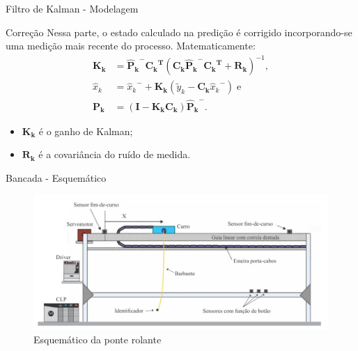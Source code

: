 \documentclass[10pt]{beamer}
\begin{document}
\begin{frame}[fragile]{Filtro de Kalman - Modelagem}
\begin{block}{Correção}
Nessa parte, o estado calculado na predição é corrigido incorporando-se uma medição mais recente do processo. Matematicamente:
\begin{align}
\label{KalmanEq6} \mathbf{K_k} &= \mathbf{{\hat{P}_{k}}^{-}}\mathbf{{C_k}^T} {\left( \mathbf{C_k}\mathbf{{\hat{P}_{k}}^{-}}\mathbf{{C_k}^T} + \mathbf{R_k} \right)}^{-1}, \\
	\label{KalmanEq7} \hat{x}_k &= {\hat{x}_{k}}^{-} + \mathbf{K_k} \left( \tilde{y}_k - \mathbf{C_k}{\hat{x}_{k}}^{-} \right)\;\mathrm{e} \\
	\label{KalmanEq8} \mathbf{P_k} &= \left( \mathbf{I} - \mathbf{K_k}\mathbf{C_k}\right)\mathbf{{\hat{P}_{k}}^{-}}.
\end{align}
\begin{itemize}
\item $\mathbf{K_k}$ é o ganho de Kalman;
\item $\mathbf{R_k}$ é a covariância do ruído de medida.
\end{itemize}
\end{block}
\end{frame}

\begin{frame}[fragile]{Bancada - Esquemático}
\begin{figure}[!ht]
	\centering
	\includegraphics[width=.9\linewidth]{figures/fundamentos/bancadaEsquematico}
	\caption{Esquemático da ponte rolante \cite{redytton}}
	\label{bancadaesq}
\end{figure}
\end{frame}
\end{document}
